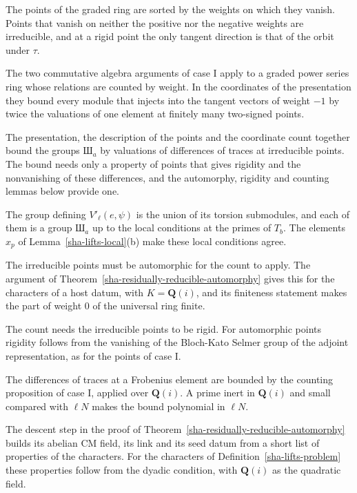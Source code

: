 The points of the graded ring are sorted by the weights on which they vanish. Points that vanish on neither the positive nor the negative weights are irreducible, and at a rigid point the only tangent direction is that of the orbit under $\tau$.

The two commutative algebra arguments of case I apply to a graded power series ring whose relations are counted by weight. In the coordinates of the presentation they bound every module that injects into the tangent vectors of weight $-1$ by twice the valuations of one element at finitely many two-signed points.

The presentation, the description of the points and the coordinate count together bound the groups $\text{Ш}_a$ by valuations of differences of traces at irreducible points. The bound needs only a property of points that gives rigidity and the nonvanishing of these differences, and the automorphy, rigidity and counting lemmas below provide one.

The group defining $V'_\ell(e,\psi)$ is the union of its torsion submodules, and each of them is a group $\text{Ш}_a$ up to the local conditions at the primes of $T_b$. The elements $x_p$ of Lemma~\ref{sha-lifts-local}(b) make these local conditions agree.

The irreducible points must be automorphic for the count to apply. The argument of Theorem~\ref{sha-residually-reducible-automorphy} gives this for the characters of a host datum, with $K=\mathbf Q(i)$, and its finiteness statement makes the part of weight $0$ of the universal ring finite.

The count needs the irreducible points to be rigid. For automorphic points rigidity follows from the vanishing of the Bloch-Kato Selmer group of the adjoint representation, as for the points of case I.

The differences of traces at a Frobenius element are bounded by the counting proposition of case I, applied over $\mathbf Q(i)$. A prime inert in $\mathbf Q(i)$ and small compared with $\ell N$ makes the bound polynomial in $\ell N$.

The descent step in the proof of Theorem~\ref{sha-residually-reducible-automorphy} builds its abelian CM field, its link and its seed datum from a short list of properties of the characters. For the characters of Definition~\ref{sha-lifts-problem} these properties follow from the dyadic condition, with $\mathbf Q(i)$ as the quadratic field.

